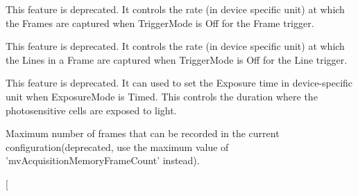 \begin{DoxyRefList}
\item[\label{deprecated__deprecated000019}%
\hypertarget{deprecated__deprecated000019}{}%
成员 \hyperlink{classmv_i_m_p_a_c_t_1_1acquire_1_1_function_interface_ae0f9f7f436a40980ce6d346ecc0e3030}{mv\+I\+M\+P\+A\+C\+T\+:\+:acquire\+:\+:Function\+Interface\+:\+:M\+V\+I\+M\+P\+A\+C\+T\+\_\+\+D\+E\+P\+R\+E\+C\+A\+T\+E\+D\+\_\+\+C\+P\+P} (int save\+System\+To\+Default(T\+Scope scope=s\+User) const )]
\item[\label{deprecated__deprecated000043}%
\hypertarget{deprecated__deprecated000043}{}%
成员 \hyperlink{classmv_i_m_p_a_c_t_1_1acquire_1_1_gen_i_cam_1_1_acquisition_control_ae005cee593783684117beca6ec37c183}{mv\+I\+M\+P\+A\+C\+T\+:\+:acquire\+:\+:Gen\+I\+Cam\+:\+:Acquisition\+Control\+:\+:acquisition\+Frame\+Rate\+Raw} ]This feature is deprecated. It controls the rate (in device specific unit) at which the Frames are captured when Trigger\+Mode is Off for the Frame trigger.  
\item[\label{deprecated__deprecated000044}%
\hypertarget{deprecated__deprecated000044}{}%
成员 \hyperlink{classmv_i_m_p_a_c_t_1_1acquire_1_1_gen_i_cam_1_1_acquisition_control_abc83f72810dfec15d0ef47c258ca8a53}{mv\+I\+M\+P\+A\+C\+T\+:\+:acquire\+:\+:Gen\+I\+Cam\+:\+:Acquisition\+Control\+:\+:acquisition\+Line\+Rate\+Raw} ]This feature is deprecated. It controls the rate (in device specific unit) at which the Lines in a Frame are captured when Trigger\+Mode is Off for the Line trigger.  
\item[\label{deprecated__deprecated000046}%
\hypertarget{deprecated__deprecated000046}{}%
成员 \hyperlink{classmv_i_m_p_a_c_t_1_1acquire_1_1_gen_i_cam_1_1_acquisition_control_aec552f1617c6891948e38f9aab39b760}{mv\+I\+M\+P\+A\+C\+T\+:\+:acquire\+:\+:Gen\+I\+Cam\+:\+:Acquisition\+Control\+:\+:exposure\+Time\+Raw} ]This feature is deprecated. It can used to set the Exposure time in device-\/specific unit when Exposure\+Mode is Timed. This controls the duration where the photosensitive cells are exposed to light.  
\item[\label{deprecated__deprecated000047}%
\hypertarget{deprecated__deprecated000047}{}%
成员 \hyperlink{classmv_i_m_p_a_c_t_1_1acquire_1_1_gen_i_cam_1_1_acquisition_control_a364974f28a1daca359f60d451609adc8}{mv\+I\+M\+P\+A\+C\+T\+:\+:acquire\+:\+:Gen\+I\+Cam\+:\+:Acquisition\+Control\+:\+:mv\+Acquisition\+Memory\+Max\+Frame\+Count} ]Maximum number of frames that can be recorded in the current configuration(deprecated, use the maximum value of 'mv\+Acquisition\+Memory\+Frame\+Count' instead).  
\item[\label{deprecated__deprecated000045}%

\end{DoxyRefList}
